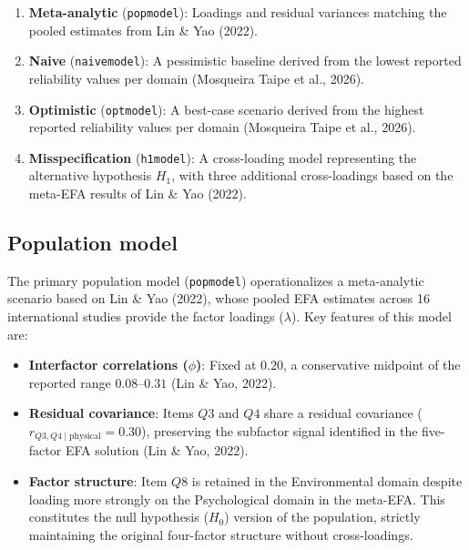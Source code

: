 \documentclass[
  letterpaper,
  DIV=11,
  numbers=noendperiod]{scrartcl}
\providecommand{\tightlist}{%
  \setlength{\itemsep}{0pt}\setlength{\parskip}{0pt}}
\begin{document}
\begin{enumerate}
\def\labelenumi{\arabic{enumi}.}
\tightlist
\item
  \textbf{Meta-analytic} (\texttt{popmodel}): Loadings and residual
  variances matching the pooled estimates from Lin \& Yao (2022).
\item
  \textbf{Naive} (\texttt{naivemodel}): A pessimistic baseline derived
  from the lowest reported reliability values per domain ({Mosqueira
  Taipe et al.}, 2026).
\item
  \textbf{Optimistic} (\texttt{optmodel}): A best-case scenario derived
  from the highest reported reliability values per domain ({Mosqueira
  Taipe et al.}, 2026).
\item
  \textbf{Misspecification} (\texttt{h1model}): A cross-loading model
  representing the alternative hypothesis \(H_1\), with three additional
  cross-loadings based on the meta-EFA results of Lin \& Yao (2022).
\end{enumerate}

\subsection{Population model}\label{population-model}

The primary population model (\texttt{popmodel}) operationalizes a
meta-analytic scenario based on Lin \& Yao (2022), whose pooled EFA
estimates across 16 international studies provide the factor loadings
(\(\lambda\)). Key features of this model are:

\begin{itemize}
\tightlist
\item
  \textbf{Interfactor correlations (\(\phi\))}: Fixed at \(0.20\), a
  conservative midpoint of the reported range \(0.08\)--\(0.31\) (Lin \&
  Yao, 2022).
\item
  \textbf{Residual covariance}: Items \(Q3\) and \(Q4\) share a residual
  covariance (\(r_{Q3, Q4 \mid \text{physical}} = 0.30\)), preserving
  the subfactor signal identified in the five-factor EFA solution (Lin
  \& Yao, 2022).
\item
  \textbf{Factor structure}: Item \(Q8\) is retained in the
  Environmental domain despite loading more strongly on the
  Psychological domain in the meta-EFA. This constitutes the null
  hypothesis (\(H_0\)) version of the population, strictly maintaining
  the original four-factor structure without cross-loadings.
\end{itemize}
\end{document}
